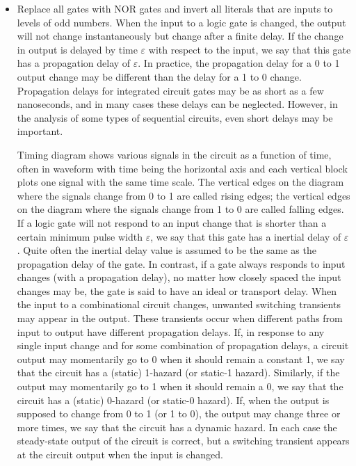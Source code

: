 \documentclass[a4paper,12pt]{article}
\begin{document}
\begin{itemize}
\begin{itemize}
\begin{itemize}
\begin{itemize}
\begin{itemize}
\begin{itemize}
\begin{itemize}
\item Replace all gates with NOR gates and invert all literals that are inputs to levels of odd numbers.
\een
{}
When the input to a logic gate is changed, the output will not change instantaneously but change after a finite delay. If the change in output is delayed by time $\varepsilon$ with respect to the input, we say that this gate has a propagation delay of $\varepsilon$. In practice, the propagation delay for a 0 to 1 output change may be different than the delay for a 1 to 0 change. Propagation delays for integrated circuit gates may be as short as a few nanoseconds, and in many cases these delays can be neglected. However, in the analysis of some types of sequential circuits, even short delays may be important.

Timing diagram shows various signals in the circuit as a function of time, often in waveform with time being the horizontal axis and each vertical block plots one signal with the same time scale. The vertical edges on the diagram where the signals change from 0 to 1 are called rising edges; the vertical edges on the diagram where the signals change from 1 to 0 are called falling edges.
If a logic gate will not respond to an input change that is shorter than a certain minimum pulse width $\varepsilon$, we say that this gate has a inertial delay of $\varepsilon$. Quite often the inertial delay value is assumed to be the same as the propagation delay of the gate. In contrast, if a gate always responds to input changes (with a propagation delay), no matter how closely spaced the input changes may be, the gate is said to have an ideal or transport delay.
When the input to a combinational circuit changes, unwanted switching transients may appear in the output. These transients occur when different paths from input to output have different propagation delays. If, in response to any single input change and for some combination of propagation delays, a circuit output may momentarily go to 0 when it should remain a constant 1, we say that the circuit has a (static) 1-hazard (or static-1 hazard). Similarly, if the output may momentarily go to 1 when it should remain a 0, we say that the circuit has a (static) 0-hazard (or static-0 hazard). If, when the output is supposed to change from 0 to 1 (or 1 to 0), the output may change three or more times, we say that the circuit has a dynamic hazard. In each case the steady-state output of the circuit is correct, but a switching transient appears at the circuit output when the input is changed.


\end{itemize}
\end{itemize}
\end{itemize}
\end{itemize}
\end{itemize}
\end{itemize}
\end{itemize}
\end{document}
